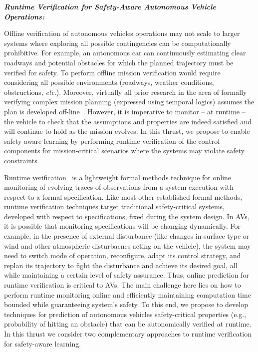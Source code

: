 \noindent\textbf{\em Runtime Verification for Safety-Aware Autonomous Vehicle Operations:} 

Offline verification of autonomous vehicles operations may not scale to larger systems where exploring all possible contingencies can be computationally prohibitive. 
For example, an autonomous car can continuously estimating clear roadways and potential obstacles for which the planned trajectory must be verified for safety. To perform offline mission verification would require considering all possible environments (roadways, weather conditions, obstructions, \emph{etc}.).  Moreover, virtually all prior research in the area of formally verifying complex mission planning (expressed using temporal logics) assumes the plan is developed off-line~\cite{saha2014automated,fainekos2005temporal,kress2009temporal}.  However, it is imperative to monitor -- at runtime -- the vehicle to check that the assumptions and properties are indeed satisfied and will continue to hold as the mission evolves. In this thrust, we propose to enable safety-aware learning by performing runtime verification of the control components for mission-critical scenarios where the systems may violate safety constraints.


 Runtime verification~\cite{SHL12} is a lightweight formal methods technique for online monitoring of evolving traces of observations from a system execution with respect to a formal specification.  Like most other established formal methods, runtime verification techniques target traditional safety-critical systems, developed with respect to specifications, fixed during the system design.  In AVs, it is possible that monitoring specifications will be changing dynamically.  For example, in the presence of external disturbance (like changes in surface type or wind and other atmospheric disturbacnes acting on the vehicle), the system may need to switch mode of operation, reconfigure, adapt its control strategy, and replan its trajectory to fight the disturbance and achieve its desired goal, all while maintaining a certain level of safety assurance. Thus, online prediction for runtime verification is critical to AVs. The main challenge here lies on how to perform runtime monitoring online and efficiently maintaining computation time bounded while guaranteeing system's safety.   To this end, we propose to develop techniques for prediction of autonomous vehicles safety-critical properties (e.g., probability of hitting an obstacle) that can be autonomically verified at runtime.  In this thrust we consider two complementary approaches to runtime verification for safety-aware learning.

